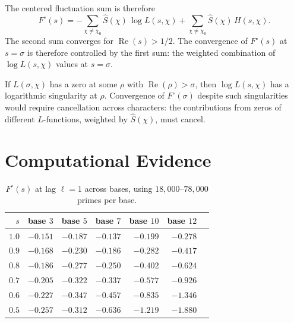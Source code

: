 \documentclass[12pt]{amsart}
\theoremstyle{definition}
\theoremstyle{remark}
\begin{document}
The centered fluctuation sum is therefore
\[
F^{\circ}(s) = -\sum_{\chi \ne \chi_0}
\hat{S}(\chi)\, \log L(s, \chi)
+ \sum_{\chi \ne \chi_0}
\hat{S}(\chi)\, H(s, \chi).
\]
The second sum converges for $\operatorname{Re}(s) > 1/2$.
The convergence of $F^{\circ}(s)$ at $s = \sigma$ is
therefore controlled by the first sum: the weighted
combination of $\log L(s, \chi)$ values at
$s = \sigma$.

If $L(\sigma, \chi)$ has a zero at some $\rho$ with
$\operatorname{Re}(\rho) > \sigma$, then
$\log L(s, \chi)$ has a logarithmic singularity at
$\rho$. Convergence of $F^{\circ}(\sigma)$ despite
such singularities would require cancellation across
characters: the contributions from zeros of different
$L$-functions, weighted by $\hat{S}(\chi)$, must cancel.

\section{Computational Evidence}

\begin{table}[h]
\centering
\begin{tabular}{rrrrrrr}
\toprule
$s$ & base $3$ & base $5$ & base $7$ & base $10$ & base $12$ \\
\midrule
$1.0$ & $-0.151$ & $-0.187$ & $-0.137$ & $-0.199$ & $-0.278$ \\
$0.9$ & $-0.168$ & $-0.230$ & $-0.186$ & $-0.282$ & $-0.417$ \\
$0.8$ & $-0.186$ & $-0.277$ & $-0.250$ & $-0.402$ & $-0.624$ \\
$0.7$ & $-0.205$ & $-0.322$ & $-0.337$ & $-0.577$ & $-0.926$ \\
$0.6$ & $-0.227$ & $-0.347$ & $-0.457$ & $-0.835$ & $-1.346$ \\
$0.5$ & $-0.257$ & $-0.312$ & $-0.636$ & $-1.219$ & $-1.880$ \\
\bottomrule
\end{tabular}
\caption{$F^{\circ}(s)$ at lag $\ell = 1$ across bases,
using $18{,}000$--$78{,}000$ primes per base.}
\label{tab:values}
\end{table}
\end{document}
